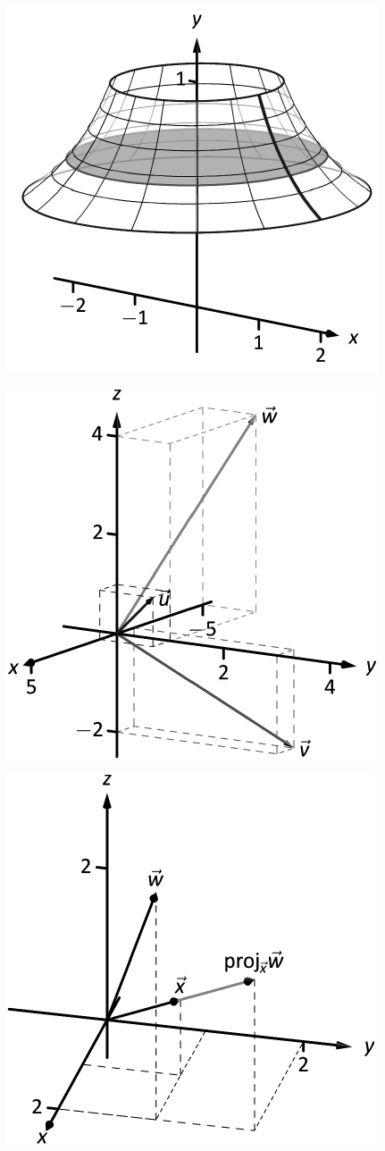 \documentclass[10pt]{article}
\begin{document}
\includegraphics{figdisk2a_3DBW.pdf}
\texttt{}

\includegraphics{figdotp3_3DBW.pdf}
\texttt{}

\includegraphics{figdotp4b_3DBW.pdf}
\texttt{}
\end{document}

